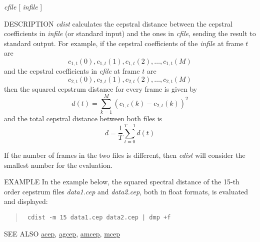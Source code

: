 \begin{synopsis}
\item [cdist] [ --m $M$ ] [ --o $O$ ] [ --f ] {\em cfile}
 	    [ {\em infile} ] 
\end{synopsis}

\begin{qsection}{DESCRIPTION}
{\em cdist} calculates the cepstral distance 
between the cepstral coefficients 
in {\em infile} (or standard input) and the ones in {\em cfile},
sending the result to standard output.
For example, if the cepstral coefficients of the {\em infile} at
frame $t$ are 
\begin{displaymath}
   c_{1,t}(0), c_{1,t}(1), c_{1,t}(2), \dots, c_{1,t}(M)
\end{displaymath}
and the cepstral coefficients in {\em cfile} at frame $t$ are
\begin{displaymath}
   c_{2,t}(0), c_{2,t}(1), c_{2,t}(2), \dots, c_{2,t}(M)
\end{displaymath}
then the squared cepstrum distance for every frame is given by
\begin{displaymath}
   d(t)=\sum_{k=1}^{M} (c_{1,t}(k)-c_{2,t}(k))^2
\end{displaymath}
and the total cepstral distance between both files is
\begin{displaymath}
   d=\frac{1}{T} \sum_{t=0}^{T-1} d(t)
\end{displaymath}

If the number of frames in the two files is different, then {\em cdist}
will consider the smallest number for the evaluation.
\end{qsection}

\begin{options}
\end{options}

\begin{qsection}{EXAMPLE}
In the example below, the squared spectral distance of the 15-th order
cepstrum files {\em data1.cep} and {\em data2.cep},
both in float formats, is evaluated and displayed:
\begin{quote}
\verb! cdist -m 15 data1.cep data2.cep | dmp +f!
\end{quote}
\end{qsection}

\begin{qsection}{SEE ALSO}
\hyperlink{acep}{acep},
\hyperlink{agcep}{agcep},
\hyperlink{amcep}{amcep},
\hyperlink{mcep}{mcep}
\end{qsection}
